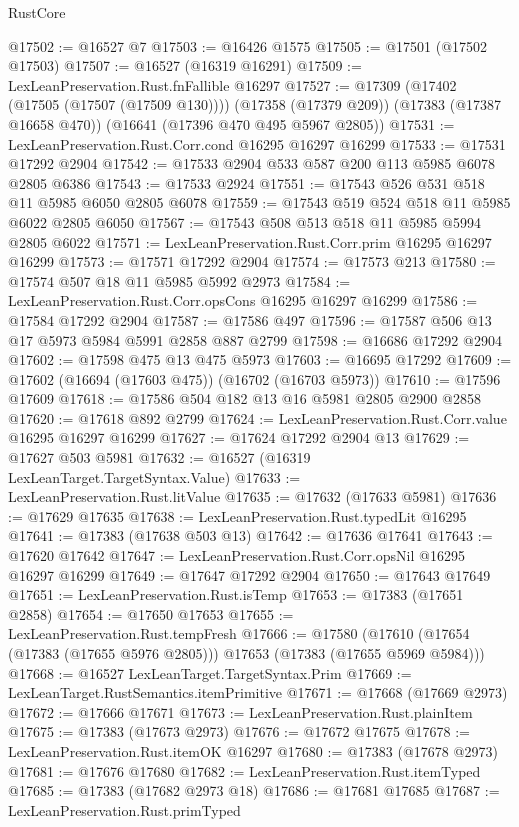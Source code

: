 \begin{lexlean}{RustCore}
\begin{coremodule}
@17502 := @16527 @7
@17503 := @16426 @1575
@17505 := @17501 (@17502 @17503)
@17507 := @16527 (@16319 @16291)
@17509 := LexLeanPreservation.Rust.fnFallible @16297
@17527 := @17309
    (@17402 (@17505 (@17507 (@17509 @130))))
    (@17358 (@17379 @209))
    (@17383 (@17387 @16658 @470))
    (@16641 (@17396 @470 @495 @5967 @2805))
@17531 := LexLeanPreservation.Rust.Corr.cond @16295 @16297 @16299
@17533 := @17531 @17292 @2904
@17542 := @17533 @2904 @533 @587 @200 @113 @5985 @6078 @2805 @6386
@17543 := @17533 @2924
@17551 := @17543 @526 @531 @518 @11 @5985 @6050 @2805 @6078
@17559 := @17543 @519 @524 @518 @11 @5985 @6022 @2805 @6050
@17567 := @17543 @508 @513 @518 @11 @5985 @5994 @2805 @6022
@17571 := LexLeanPreservation.Rust.Corr.prim @16295 @16297 @16299
@17573 := @17571 @17292 @2904
@17574 := @17573 @213
@17580 := @17574 @507 @18 @11 @5985 @5992 @2973
@17584 := LexLeanPreservation.Rust.Corr.opsCons @16295 @16297 @16299
@17586 := @17584 @17292 @2904
@17587 := @17586 @497
@17596 := @17587 @506 @13 @17 @5973 @5984 @5991 @2858 @887 @2799
@17598 := @16686 @17292 @2904
@17602 := @17598 @475 @13 @475 @5973
@17603 := @16695 @17292
@17609 := @17602 (@16694 (@17603 @475)) (@16702 (@16703 @5973))
@17610 := @17596 @17609
@17618 := @17586 @504 @182 @13 @16 @5981 @2805 @2900 @2858
@17620 := @17618 @892 @2799
@17624 := LexLeanPreservation.Rust.Corr.value @16295 @16297 @16299
@17627 := @17624 @17292 @2904 @13
@17629 := @17627 @503 @5981
@17632 := @16527 (@16319 LexLeanTarget.TargetSyntax.Value)
@17633 := LexLeanPreservation.Rust.litValue
@17635 := @17632 (@17633 @5981)
@17636 := @17629 @17635
@17638 := LexLeanPreservation.Rust.typedLit @16295
@17641 := @17383 (@17638 @503 @13)
@17642 := @17636 @17641
@17643 := @17620 @17642
@17647 := LexLeanPreservation.Rust.Corr.opsNil @16295 @16297 @16299
@17649 := @17647 @17292 @2904
@17650 := @17643 @17649
@17651 := LexLeanPreservation.Rust.isTemp
@17653 := @17383 (@17651 @2858)
@17654 := @17650 @17653
@17655 := LexLeanPreservation.Rust.tempFresh
@17666 := @17580
    (@17610 (@17654 (@17383 (@17655 @5976 @2805))) @17653 (@17383 (@17655 @5969 @5984)))
@17668 := @16527 LexLeanTarget.TargetSyntax.Prim
@17669 := LexLeanTarget.RustSemantics.itemPrimitive
@17671 := @17668 (@17669 @2973)
@17672 := @17666 @17671
@17673 := LexLeanPreservation.Rust.plainItem
@17675 := @17383 (@17673 @2973)
@17676 := @17672 @17675
@17678 := LexLeanPreservation.Rust.itemOK @16297
@17680 := @17383 (@17678 @2973)
@17681 := @17676 @17680
@17682 := LexLeanPreservation.Rust.itemTyped
@17685 := @17383 (@17682 @2973 @18)
@17686 := @17681 @17685
@17687 := LexLeanPreservation.Rust.primTyped

\end{coremodule}
\end{lexlean}
